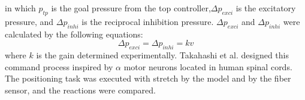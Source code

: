 in which $p_{tp}$ is the goal pressure from the top controller,$\Delta p_{exci}$ is the excitatory pressure, and $ \Delta p_{inhi}$ is the reciprocal inhibition pressure. 
$\Delta p_{exci}$ and $\Delta p_{inhi}$ were calculated by the following equations:
\begin{equation}
    \label{eq:reflex_pressure}
    \Delta p_{exci} =  \Delta p_{inhi} = kv
\end{equation}
where $k$ is the gain determined experimentally.
Takahashi et al. designed this command process inspired by $\alpha$ motor neurons located in human spinal cords\cite{takahashi}. The positioning task was executed with stretch by the model and by the fiber sensor, and the reactions were compared.






